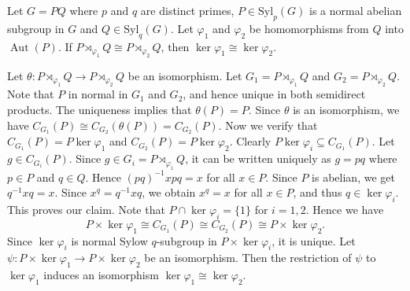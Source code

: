 \begin{lemma} \label{lemma-noob}
	Let $G = PQ$ where $p$ and $q$ are distinct primes, $P \in \text{Syl}_p(G)$ is a normal abelian subgroup in $G$ and $Q \in \text{Syl}_q(G)$. Let $\varphi_1$ and $\varphi_2$ be homomorphisms from $Q$ into $\operatorname{Aut}(P)$. If $P\rtimes_{\varphi_1} Q \cong P\rtimes_{\varphi_2} Q$,   then $\ker \varphi_1 \cong \ker \varphi_2$.
\end{lemma}
\begin{sketch}
	Let $\theta: P\rtimes_{\varphi_1} Q \rightarrow P\rtimes_{\varphi_2} Q$ be an isomorphism. Let $G_1 = P\rtimes_{\varphi_1} Q$ and $G_2 = P\rtimes_{\varphi_2} Q$. Note that  $P$ in normal in $G_1$ and $G_2$, and hence unique  in both semidirect products. The uniqueness implies that $\theta(P) = P$. Since $\theta$ is an isomorphism, we have $C_{G_1}(P) \cong C_{G_2}(\theta(P)) = C_{G_2}(P)$. Now we verify that $C_{G_1}(P) = P\ker \varphi_1$ and $C_{G_2}(P) = P\ker \varphi_2$. Clearly $P\ker \varphi_i \subseteq C_{G_1}(P)$. Let $g\in C_{G_i}(P)$. Since $g\in G_i = P\rtimes_{\varphi_1} Q$,  it can be written uniquely as $g = pq$ where $p\in P$ and $q\in Q$. Hence $(pq)^{-1}xpq = x$ for all $x\in P$. Since $P$ is abelian, we get $q^{-1}xq = x$. Since $x^{q} = q^{-1}xq$, we obtain $x^q = x$ for all $x\in P$, and thus $q\in\ker \varphi_i$. This proves our claim. Note that $P\cap \ker\varphi_i =\{1\}$ for $i=1,2$. Hence we have 
	\begin{equation*}
	P\times \ker \varphi_1\cong	C_{G_1}(P) \cong  C_{G_2}(P) \cong P\times \ker \varphi_2.
	\end{equation*}
	Since $\ker \varphi_i$ is normal Sylow $q$-subgroup in $P\times \ker \varphi_i$, it is unique. Let $\psi:P\times \ker \varphi_1\rightarrow P\times \ker \varphi_2$ be an isomorphism. Then the restriction of $\psi$ to $\ker \varphi_1$ induces an isomorphism $\ker\varphi_1 \cong \ker\varphi_2$.
\end{sketch} 

